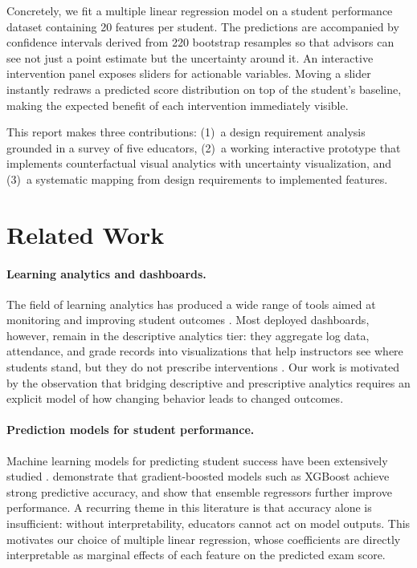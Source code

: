 \documentclass[11pt]{article}
\begin{document}
Concretely, we fit a multiple linear regression model on a student performance dataset containing 20 features per student. The predictions are accompanied by confidence intervals derived from 220 bootstrap resamples so that advisors can see not just a point estimate but the uncertainty around it. An interactive intervention panel exposes sliders for actionable variables. Moving a slider instantly redraws a predicted score distribution on top of the student's baseline, making the expected benefit of each intervention immediately visible.

This report makes three contributions: (1)~a design requirement analysis grounded in a survey of five educators, (2)~a working interactive prototype that implements counterfactual visual analytics with uncertainty visualization, and (3)~a systematic mapping from design requirements to implemented features.

\section{Related Work}
\label{sec:related}

\paragraph{Learning analytics and dashboards.}
The field of learning analytics has produced a wide range of tools aimed at monitoring and improving student outcomes \cite{siemens2013learning}. Most deployed dashboards, however, remain in the descriptive analytics tier: they aggregate log data, attendance, and grade records into visualizations that help instructors see where students stand, but they do not prescribe interventions \cite{papamitsiou2014learning}. Our work is motivated by the observation that bridging descriptive and prescriptive analytics requires an explicit model of how changing behavior leads to changed outcomes.

\paragraph{Prediction models for student performance.}
Machine learning models for predicting student success have been extensively studied \cite{romero2020educational}. \citet{asselman2023} demonstrate that gradient-boosted models such as XGBoost achieve strong predictive accuracy, and \citet{khalaf2025} show that ensemble regressors further improve performance. A recurring theme in this literature is that accuracy alone is insufficient: without interpretability, educators cannot act on model outputs. This motivates our choice of multiple linear regression, whose coefficients are directly interpretable as marginal effects of each feature on the predicted exam score.
\end{document}
